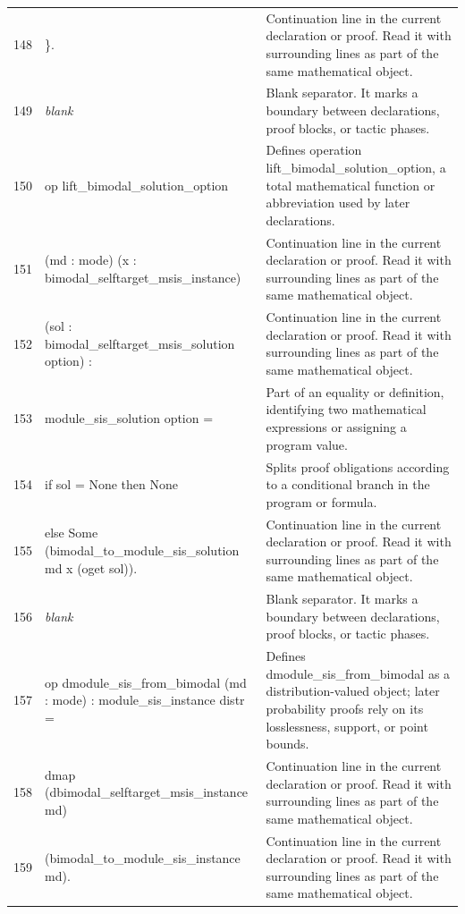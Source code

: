 \documentclass[10pt]{article}
\begin{document}
\begin{longtable}{r L{0.53\textwidth} L{0.37\textwidth}}
148 & {\ttfamily\scriptsize \}.} & Continuation line in the current declaration or proof.  Read it with surrounding lines as part of the same mathematical object. \\
149 & {\ttfamily\scriptsize \emph{blank}} & Blank separator.  It marks a boundary between declarations, proof blocks, or tactic phases. \\
150 & {\ttfamily\scriptsize op lift\_bimodal\_solution\_option} & Defines operation lift\_bimodal\_solution\_option, a total mathematical function or abbreviation used by later declarations. \\
151 & {\ttfamily\scriptsize    (md : mode) (x : bimodal\_selftarget\_msis\_instance)} & Continuation line in the current declaration or proof.  Read it with surrounding lines as part of the same mathematical object. \\
152 & {\ttfamily\scriptsize    (sol : bimodal\_selftarget\_msis\_solution option) :} & Continuation line in the current declaration or proof.  Read it with surrounding lines as part of the same mathematical object. \\
153 & {\ttfamily\scriptsize    module\_sis\_solution option =} & Part of an equality or definition, identifying two mathematical expressions or assigning a program value. \\
154 & {\ttfamily\scriptsize   if sol = None then None} & Splits proof obligations according to a conditional branch in the program or formula. \\
155 & {\ttfamily\scriptsize   else Some (bimodal\_to\_module\_sis\_solution md x (oget sol)).} & Continuation line in the current declaration or proof.  Read it with surrounding lines as part of the same mathematical object. \\
156 & {\ttfamily\scriptsize \emph{blank}} & Blank separator.  It marks a boundary between declarations, proof blocks, or tactic phases. \\
157 & {\ttfamily\scriptsize op dmodule\_sis\_from\_bimodal (md : mode) : module\_sis\_instance distr =} & Defines dmodule\_sis\_from\_bimodal as a distribution-valued object; later probability proofs rely on its losslessness, support, or point bounds. \\
158 & {\ttfamily\scriptsize   dmap (dbimodal\_selftarget\_msis\_instance md)} & Continuation line in the current declaration or proof.  Read it with surrounding lines as part of the same mathematical object. \\
159 & {\ttfamily\scriptsize     (bimodal\_to\_module\_sis\_instance md).} & Continuation line in the current declaration or proof.  Read it with surrounding lines as part of the same mathematical object. \\

\end{longtable}
\end{document}
